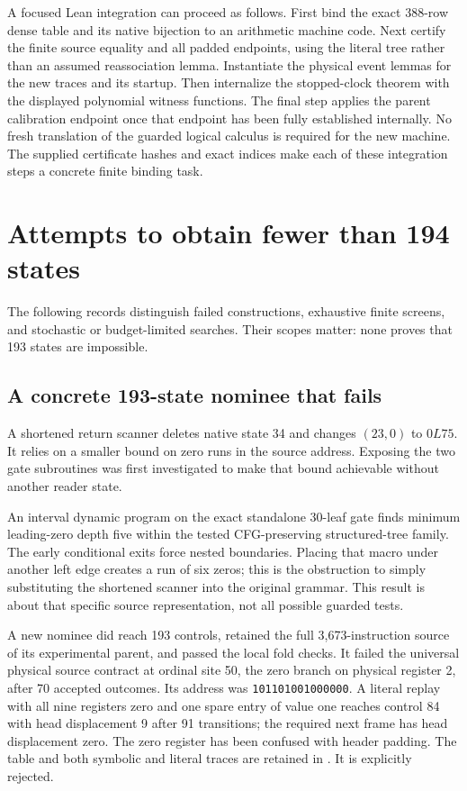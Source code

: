 \documentclass[10pt,a4paper]{article}
\theoremstyle{definition}
\begin{document}
A focused Lean integration can proceed as follows. First bind the exact
388-row dense table and its native bijection to an arithmetic machine
code. Next certify the finite source equality and all padded endpoints,
using the literal tree rather than an assumed reassociation lemma.
Instantiate the physical event lemmas for the new traces and its startup.
Then internalize the stopped-clock theorem with the displayed polynomial
witness functions. The final step applies the parent calibration endpoint
once that endpoint has been fully established internally. No fresh
translation of the guarded logical calculus is required for the new
machine. The supplied certificate hashes and exact indices make each of
these integration steps a concrete finite binding task.

\section{Attempts to obtain fewer than 194 states}
\label{sec:search}

The following records distinguish failed constructions, exhaustive finite
screens, and stochastic or budget-limited searches. Their scopes matter:
none proves that 193 states are impossible.

\subsection{A concrete 193-state nominee that fails}

A shortened return scanner deletes native state 34 and changes
$(23,0)$ to $0L75$. It relies on a smaller bound on zero runs in the
source address. Exposing the two gate subroutines was first investigated
to make that bound achievable without another reader state.

An interval dynamic program on the exact standalone 30-leaf gate finds
minimum leading-zero depth five within the tested CFG-preserving
structured-tree family. The early conditional exits force nested
boundaries. Placing that macro under another left edge creates a run of
six zeros; this is the obstruction to simply substituting the shortened
scanner into the original grammar. This result is about that specific
source representation, not all possible guarded tests.

A new nominee did reach 193 controls, retained the full 3,673-instruction
source of its experimental parent, and passed the local fold checks.
It failed the universal physical source contract at ordinal site 50,
the zero branch on physical register 2, after 70 accepted outcomes. Its
address was \texttt{101101001000000}. A literal replay with all nine
registers zero and one spare entry of value one reaches control 84 with
head displacement 9 after 91 transitions; the required next frame has
head displacement zero. The zero register has been confused with header
padding. The table and both symbolic and literal traces are retained in
. It is explicitly rejected.
\end{document}

